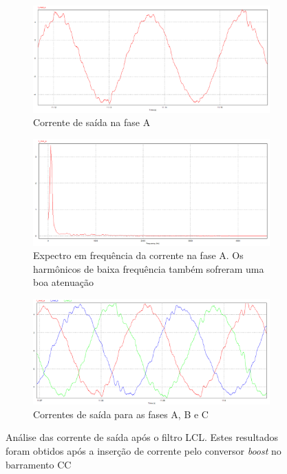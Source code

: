 \begin{figure}[!hbt]
	\centering
	\begin{subfigure}[b]{0.5\textwidth}
		\centering
		\includegraphics[width=\textwidth]{figuras/sim_figures/sistema_completo/corrente_saida_inversor_1.PNG}
		\caption{Corrente de saída na fase A}
    \end{subfigure}

    \begin{subfigure}[b]{0.5\textwidth}
		\centering
		\includegraphics[width=\textwidth]{figuras/sim_figures/sistema_completo/corrente_saida_inversor_fft.PNG}
		\caption{Expectro em frequência da corrente na fase A. Os harmônicos de baixa frequência também sofreram uma boa atenuação}
    \end{subfigure}

	\begin{subfigure}[b]{0.5\textwidth}
		\includegraphics[width=\textwidth]{figuras/sim_figures/sistema_completo/corrente_saida_inversor_2.PNG}
		\caption{Correntes de saída para as fases A, B e C}
	\end{subfigure}
    \caption{Análise das corrente de saída após o filtro LCL. Estes resultados foram obtidos após a inserção de corrente pelo conversor \textit{boost} no barramento CC}
    \label{fig:sim-corrente-saida-inversor}
\end{figure}

